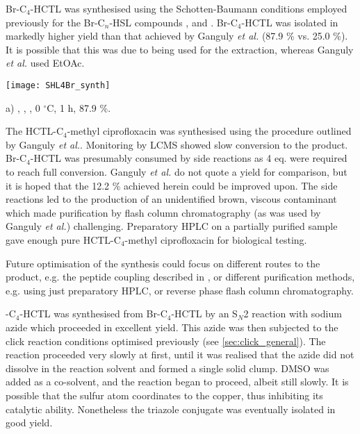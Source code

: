 Br-C$_4$-HCTL  was synthesised using the Schotten-Baumann conditions employed previously for the Br-C$_n$-HSL compounds ,  and . Br-C$_4$-HCTL  was isolated in markedly higher yield than that achieved by Ganguly \textit{et al.}\cite{Ganguly2011} (87.9 \% vs. 25.0 \%). It is possible that this was due to  being used for the extraction, whereas Ganguly \textit{et al.} used EtOAc.

\begin{scheme}[H]
	\begin{center}
		\texttt{[image: SHL4Br\_synth]}
		\caption{a) , , , 0 $^{\circ}$C, 1 h, 87.9 \%.\label{sch:SHL4Br_synth}}
	\end{center}
\end{scheme}

The HCTL-C$_4$-methyl ciprofloxacin  was synthesised using the procedure outlined by Ganguly \textit{et al.}\cite{Ganguly2011}. Monitoring by LCMS showed slow conversion to the product. Br-C$_4$-HCTL  was presumably consumed by side reactions as 4 eq. were required to reach full conversion. Ganguly \textit{et al.} do not quote a yield for comparison\cite{Ganguly2011}\cite{Iyer2012}, but it is hoped that the 12.2 \% achieved herein could be improved upon. The side reactions led to the production of an unidentified brown, viscous contaminant which made purification by flash column chromatography (as was used by Ganguly \textit{et al.}) challenging. Preparatory HPLC on a partially purified sample gave enough pure HCTL-C$_4$-methyl ciprofloxacin  for biological testing. 

Future optimisation of the synthesis could focus on different routes to the product, e.g. the peptide coupling described in , or different purification methods, e.g. using just preparatory HPLC, or reverse phase flash column chromatography.

-C$_4$-HCTL  was synthesised from Br-C$_4$-HCTL  by an S$_N$2 reaction with sodium azide which proceeded in excellent yield. This azide  was then subjected to the click reaction conditions optimised previously (see \ref{sec:click_general}). The reaction proceeded very slowly at first, until it was realised that the azide did not dissolve in the reaction solvent and formed a single solid clump. DMSO was added as a co-solvent, and the reaction began to proceed, albeit still slowly. It is possible that the sulfur atom coordinates to the copper, thus inhibiting its catalytic ability. Nonetheless the triazole conjugate  was eventually isolated in good yield.

